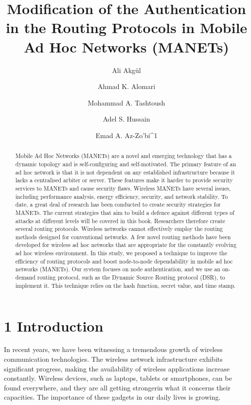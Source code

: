 \documentclass{default}
\begin{document}
\journalheader

\title{Modification of the Authentication in the Routing Protocols in Mobile Ad Hoc Networks (MANETs)}
\author{Ali Akgül \and Ahmad K. Alomari \and Mohammad A. Tashtoush \and Adel S. Hussain \and Emad A. Az-Zo'bi^{1}}
\date{}
\maketitle

\begin{abstract}
Mobile Ad Hoc Networks (MANETs) are a novel and emerging technology that has a dynamic topology and is self-configuring and self-motivated. The primary feature of an ad hoc network is that it is not dependent on any established infrastructure because it lacks a centralised arbiter or server. These features make it harder to provide security services to MANETs and cause security flaws. Wireless MANETs have several issues, including performance analysis, energy efficiency, security, and network stability. To date, a great deal of research has been conducted to create security strategies for MANETs. The current strategies that aim to build a defence against different types of attacks at different levels will be covered in this book. Researchers therefore create several routing protocols. Wireless networks cannot effectively employ the routing methods designed for conventional networks. A few novel routing methods have been developed for wireless ad hoc networks that are appropriate for the constantly evolving ad hoc wireless environment. In this study, we proposed a technique to improve the efficiency of routing protocols and boost node-to-node dependability in mobile ad hoc networks (MANETs). Our system focuses on node authentication, and we use an on-demand routing protocol, such as the Dynamic Source Routing protocol (DSR), to implement it. This technique relies on the hash function, secret value, and time stamp.
\end{abstract}

\section{1 Introduction}

In recent years, we have been witnessing a tremendous growth of wireless communication technologies. The wireless network infrastructure exhibits significant progress, making the availability of wireless applications increase constantly. Wireless devices, such as laptops, tablets or smartphones, can be found everywhere, and they are all getting strongerin what it concerns their capacities. The importance of these gadgets in our daily lives is growing.
\end{document}
